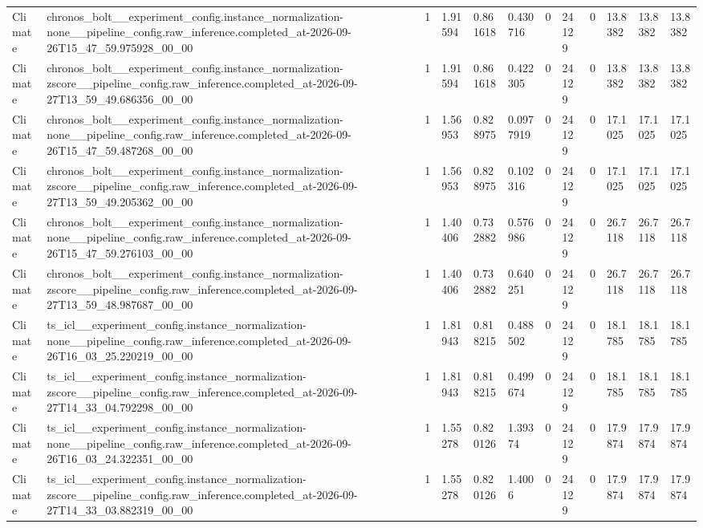 \begin{tabular}{llllllllllll}
Climate & chronos\_bolt\_\_experiment\_config.instance\_normalization-none\_\_pipeline\_config.raw\_inference.completed\_at-2026-09-26T15\_47\_59.975928\_00\_00 & 1 & 1.91594 & 0.861618 & 0.430716 & 0 & 24129 & 0 & 13.8382 & 13.8382 & 13.8382 \\
Climate & chronos\_bolt\_\_experiment\_config.instance\_normalization-zscore\_\_pipeline\_config.raw\_inference.completed\_at-2026-09-27T13\_59\_49.686356\_00\_00 & 1 & 1.91594 & 0.861618 & 0.422305 & 0 & 24129 & 0 & 13.8382 & 13.8382 & 13.8382 \\
Climate & chronos\_bolt\_\_experiment\_config.instance\_normalization-none\_\_pipeline\_config.raw\_inference.completed\_at-2026-09-26T15\_47\_59.487268\_00\_00 & 1 & 1.56953 & 0.828975 & 0.0977919 & 0 & 24129 & 0 & 17.1025 & 17.1025 & 17.1025 \\
Climate & chronos\_bolt\_\_experiment\_config.instance\_normalization-zscore\_\_pipeline\_config.raw\_inference.completed\_at-2026-09-27T13\_59\_49.205362\_00\_00 & 1 & 1.56953 & 0.828975 & 0.102316 & 0 & 24129 & 0 & 17.1025 & 17.1025 & 17.1025 \\
Climate & chronos\_bolt\_\_experiment\_config.instance\_normalization-none\_\_pipeline\_config.raw\_inference.completed\_at-2026-09-26T15\_47\_59.276103\_00\_00 & 1 & 1.40406 & 0.732882 & 0.576986 & 0 & 24129 & 0 & 26.7118 & 26.7118 & 26.7118 \\
Climate & chronos\_bolt\_\_experiment\_config.instance\_normalization-zscore\_\_pipeline\_config.raw\_inference.completed\_at-2026-09-27T13\_59\_48.987687\_00\_00 & 1 & 1.40406 & 0.732882 & 0.640251 & 0 & 24129 & 0 & 26.7118 & 26.7118 & 26.7118 \\
Climate & ts\_icl\_\_experiment\_config.instance\_normalization-none\_\_pipeline\_config.raw\_inference.completed\_at-2026-09-26T16\_03\_25.220219\_00\_00 & 1 & 1.81943 & 0.818215 & 0.488502 & 0 & 24129 & 0 & 18.1785 & 18.1785 & 18.1785 \\
Climate & ts\_icl\_\_experiment\_config.instance\_normalization-zscore\_\_pipeline\_config.raw\_inference.completed\_at-2026-09-27T14\_33\_04.792298\_00\_00 & 1 & 1.81943 & 0.818215 & 0.499674 & 0 & 24129 & 0 & 18.1785 & 18.1785 & 18.1785 \\
Climate & ts\_icl\_\_experiment\_config.instance\_normalization-none\_\_pipeline\_config.raw\_inference.completed\_at-2026-09-26T16\_03\_24.322351\_00\_00 & 1 & 1.55278 & 0.820126 & 1.39374 & 0 & 24129 & 0 & 17.9874 & 17.9874 & 17.9874 \\
Climate & ts\_icl\_\_experiment\_config.instance\_normalization-zscore\_\_pipeline\_config.raw\_inference.completed\_at-2026-09-27T14\_33\_03.882319\_00\_00 & 1 & 1.55278 & 0.820126 & 1.4006 & 0 & 24129 & 0 & 17.9874 & 17.9874 & 17.9874 \\

\end{tabular}
